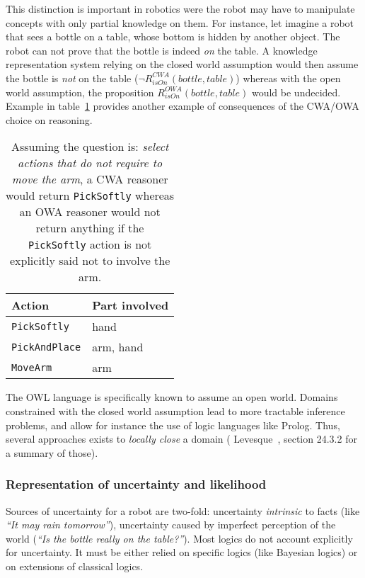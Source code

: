 This distinction is important in robotics were the robot may have to manipulate
concepts with only partial knowledge on them. For instance, let imagine a robot
that sees a bottle on a table, whose bottom is hidden by another object. The
robot can not prove that the bottle is indeed \emph{on} the table. A knowledge
representation system relying on the closed world assumption would then assume
the bottle is \emph{not} on the table ($\lnot R^{CWA}_{isOn}(bottle, table)$)
whereas with the open world assumption, the proposition $R^{OWA}_{isOn}(bottle,
table)$ would be undecided. Example in table~\ref{table|cwa-owa-example} provides
another example of consequences of the CWA/OWA choice on reasoning.

\begin{table}
    \begin{center}
    \begin{tabular}{ll}
    {\bf Action} & {\bf Part involved} \\
    \hline
    {\tt PickSoftly} & hand \\
    {\tt PickAndPlace} & arm, hand \\
    {\tt MoveArm} & arm \\
    \hline
    \end{tabular}
    \end{center}
    \caption{Assuming the question is: \emph{select actions that do not require
    to move the arm}, a CWA reasoner would return {\tt PickSoftly} whereas an
    OWA reasoner would not return anything if the {\tt PickSoftly} action is
    not explicitly said not to involve the arm.}
    \label{table|cwa-owa-example}
\end{table}

The OWL language is specifically known to assume an open world.  Domains
constrained with the closed world assumption lead to more tractable inference
problems, and allow for instance the use of logic languages like Prolog. Thus,
several approaches exists to \emph{locally close} a domain (\cf
Levesque~\cite{Levesque2008}, section 24.3.2 for a summary of those).

\subsubsection{Representation of uncertainty and likelihood}

Sources of uncertainty for a robot are two-fold: uncertainty \emph{intrinsic}
to facts (like \emph{``It may rain tomorrow''}), uncertainty caused by
imperfect perception of the world (\emph{``Is the bottle really on the
table?''}). Most logics do not account explicitly for uncertainty. It must be
either relied on specific logics (like Bayesian logics) or on extensions of
classical logics.

